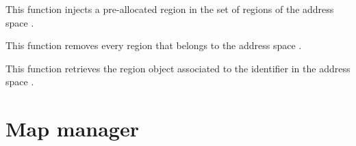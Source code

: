 \begin{itemize}
	 {
	   This function injects a pre-allocated region in the set of
	   regions of the address space .
	 }

	 {
	   This function removes every region that belongs to the
	   address space .
	 }

		  {
		    This function retrieves the region object
		     associated to the identifier
		     in the address space
		    .
		  }

\end{itemize}

%
%

\newpage

\section{Map manager}

